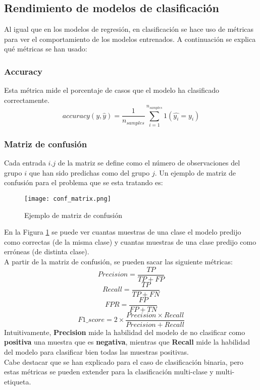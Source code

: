 \subsection{Rendimiento de modelos de clasificación}
\label{metric:class}
Al igual que en los modelos de regresión, en clasificación se hace uso de métricas para ver el comportamiento de los modelos entrenados. A continuación se explica qué métricas se han usado:
\subsubsection*{Accuracy}
Esta métrica mide el porcentaje de casos que el modelo ha clasificado correctamente.
\[accuracy(y,\hat{y})=\frac{1}{n_{samples}}\sum_{i=1}^{n_{samples}}1(\hat{y_i}=y_i)\]
\subsubsection*{Matriz de confusión}
Cada entrada $i.j$ de la matriz se define como el número de observaciones del grupo $i$ que han sido predichas como del grupo $j$. Un ejemplo de matriz de confusión para el problema que se esta tratando es:
\begin{figure}[H]
	\centering
	\texttt{[image: conf\_matrix.png]}
	\caption{Ejemplo de matriz de confusión}
	\label{fig:conf_matrix}
\end{figure}
En la Figura \ref{fig:conf_matrix} se puede ver cuantas muestras de una clase el modelo predijo como correctas (de la misma clase) y cuantas muestras de una clase predijo como erróneas (de distinta clase).\\
\clearpage
A partir de la matriz de confusión, se pueden sacar las siguiente métricas:
\[Precision = \frac{TP} {TP + FP}\]
\[Recall = \frac{TP}{TP + FN}\]
\[FPR = \frac{FP}{FP + TN}\]
\[F1\_score = 2 \times \frac{Precision \times Recall}{Precision + Recall}\]
Intuitivamente, \textbf{Precision} mide la habilidad del modelo de no clasificar como \textbf{positiva} una muestra que es \textbf{negativa}, mientras que \textbf{Recall} mide la habilidad del modelo para clasificar bien todas las muestras positivas.\\
\linebreak
Cabe destacar que se han explicado para el caso de clasificación binaria, pero estas métricas se pueden extender para la clasificación multi-clase y multi-etiqueta.
